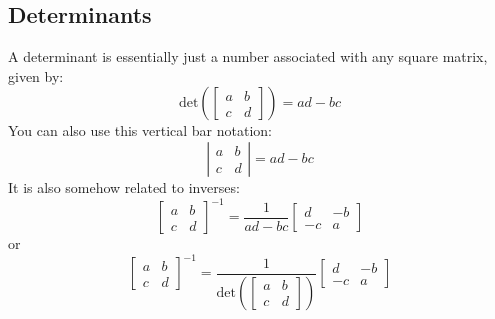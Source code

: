 \documentclass[11pt]{book}
\begin{document}
{{\subsection{Determinants}
\par{A determinant is essentially just a number associated with any square matrix, given by: \[
\mathrm{det}\left(\left[		
	\begin{matrix}
			a & b \\
			c & d
	\end{matrix}
\right]\right)=ad-bc
\] You can also use this vertical bar notation: \[
\left|
	\begin{matrix}
			a & b \\
			c & d
	\end{matrix}
\right|=ad-bc
\] It is also somehow related to inverses: \[
\left[		
	\begin{matrix}
			a & b \\
			c & d
	\end{matrix}
\right]^{-1}=\frac{1}{ad-bc}\left[
	\begin{matrix}
			d & -b \\
			-c & a
	\end{matrix}
\right]
\] or \[
\left[		
	\begin{matrix}
			a & b \\
			c & d
	\end{matrix}
\right]^{-1}=\frac{1}{\mathrm{det}\left(\left[
\begin{matrix}
			a & b \\
			c & d
\end{matrix}
\right]\right)}\left[
	\begin{matrix}
			d & -b \\
			-c & a
	\end{matrix}
\right]
\]  
}
}}
\end{document}
